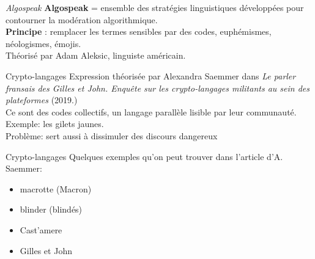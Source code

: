 \begin{frame}{\textit{Algospeak}}
\textbf{Algospeak} = ensemble des stratégies linguistiques développées pour contourner la modération algorithmique.\\
\textbf{Principe} : remplacer les termes sensibles par des codes, euphémismes, néologismes, émojis. \\
Théorisé par Adam Aleksic, linguiste américain.
\end{frame}

\begin{frame}{Crypto-langages}
    Expression théorisée par Alexandra Saemmer dans \textit{Le parler fransais des Gilles et John. Enquête sur les crypto-langages militants au sein des plateformes} (2019.)\\
    Ce sont des codes collectifs, un langage parallèle lisible par leur communauté.\\
    Exemple: les gilets jaunes.\\
    \vspace{1em}
    Problème: sert aussi à dissimuler des discours dangereux
\end{frame}

\begin{frame}{Crypto-langages}
    Quelques exemples qu'on peut trouver dans l'article d'A. Saemmer:
    \begin{itemize}
        \item macrotte (Macron)
        \item blinder (blindés)
        \item Cast’amere
        \item Gilles et John
    \end{itemize}
\end{frame}